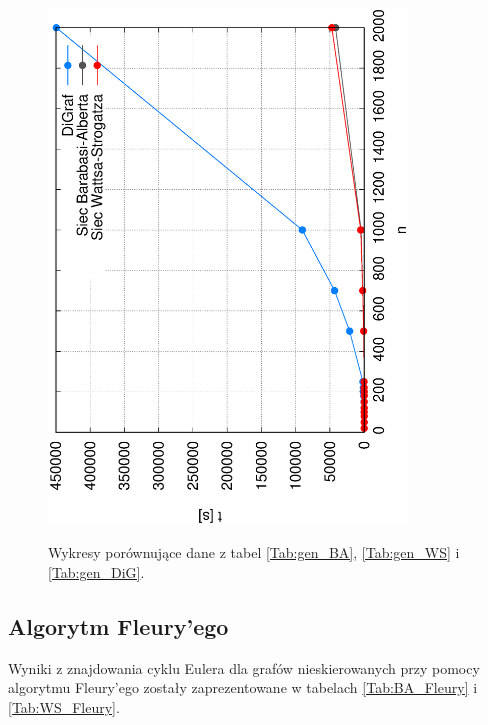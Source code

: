 \documentclass[a4paper, 12pt, twoside, openright]{article}
\begin{document}
\begin{figure}[!p]
{		\includegraphics[angle=270,width=0.85\textwidth]{img/wyniki/gen_n}}
	\caption[]{Wykresy porównujące dane z tabel \ref{Tab:gen_BA}, \ref{Tab:gen_WS} i \ref{Tab:gen_DiG}.}
	\label{gen}
\end{figure}


\newpage




\subsection{Algorytm Fleury'ego} \label{Fleu_wyniki}
\indent\par
	Wyniki z znajdowania cyklu Eulera dla grafów nieskierowanych przy pomocy algorytmu Fleury'ego zostały zaprezentowane w tabelach \ref{Tab:BA_Fleury} i \ref{Tab:WS_Fleury}. 
	
\end{document}
